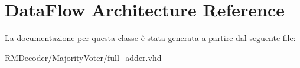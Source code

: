 \hypertarget{classfull__adder_1_1_data_flow}{\section{Data\+Flow Architecture Reference}
\label{classfull__adder_1_1_data_flow}
}


La documentazione per questa classe è stata generata a partire dal seguente file\+:\begin{DoxyCompactItemize}
\item 
R\+M\+Decoder/\+Majority\+Voter/\hyperlink{full__adder_8vhd}{full\+\_\+adder.\+vhd}\end{DoxyCompactItemize}
